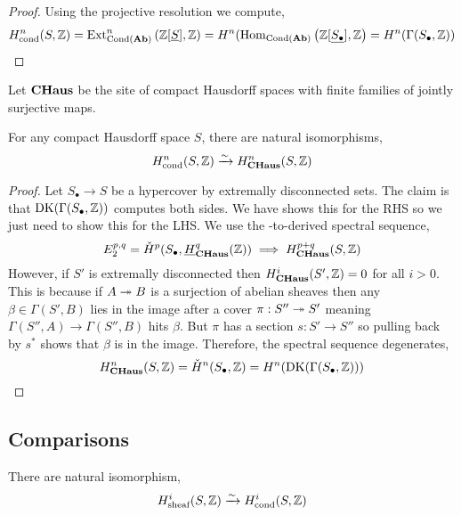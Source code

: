 \documentclass[12pt]{article}
\newcommand{\cond}{\text{cond}}
\newcommand{\sheaf}{\text{sheaf}}
\newcommand{\Cond}{\mathrm{Cond}}
\newcommand{\DK}{\mathrm{DK}}
\renewcommand{\Cech}{\text{\v{C}ech}\xspace}
\begin{document}
\begin{proof}
Using the projective resolution we compute,
\[ H^n_{\cond}(S, \Z) = \Ext{n}{\Cond(\Ab)}{\Z[\underline{S}]}{\Z} = H^n(\Hom{\Cond(\Ab)}{\Z[\underline{S_\bullet}]}{\Z} = H^n(\Gamma(S_\bullet, \Z)) \]
\end{proof}

\begin{defn}
Let $\mathbf{CHaus}$ be the site of compact Hausdorff spaces with finite families of jointly surjective maps.
\end{defn}

\begin{prop}
For any compact Hausdorff space $S$, there are natural isomorphisms,
\[ H^n_{\cond}(S, \Z) \iso H^n_{\CHaus}(S, \Z) \]
\end{prop}

\begin{proof}
Let $S_\bullet \to S$ be a hypercover by extremally disconnected sets. The claim is that $\DK(\Gamma(S_\bullet, \Z))$ computes both sides. We have shows this for the RHS so we just need to show this for the LHS. We use the \Cech-to-derived spectral sequence,
\[ E^{p,q}_2 = \check{H}^p(S_\bullet, \underline{H}_{\mathbf{CHaus}}^q(\mathbb{Z})) \implies H^{p+q}_{\mathbf{CHaus}}(S, \mathbb{Z}) \]
However, if $S'$ is extremally disconnected then $H^i_{\mathbf{CHaus}}(S', \mathbb{Z}) = 0$ for all $i > 0$. This is because if $A \twoheadrightarrow B$ is a surjection of abelian sheaves then any $\beta \in \Gamma(S', B)$ lies in the image after a cover $\pi : S'' \twoheadrightarrow S'$ meaning $\Gamma(S'', A) \to \Gamma(S'', B)$ hits $\beta$. But $\pi$ has a section $s : S' \to S''$ so pulling back by $s^*$ shows that $\beta$ is in the image. Therefore, the spectral sequence degenerates,
\[ H^n_{\CHaus}(S, \Z) = \check{H}^n(S_\bullet, \Z) = H^n(\DK(\Gamma(S_\bullet, \Z))) \]
\end{proof}

\subsection{Comparisons}

\begin{theorem}
There are natural isomorphism,
\[ H^i_{\sheaf}(S, \Z) \iso H^i_{\cond}(S, \Z) \]
\end{theorem}
\end{document}
